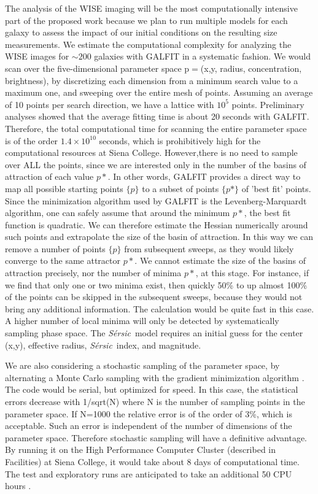 \documentclass[11pt, preprint]{aastex}
\newcommand{\sers}{{\it S\'{e}rsic}}
\begin{document}
{The analysis of the WISE imaging will be the most computationally
intensive part of the proposed work because we plan to run multiple
models for each galaxy to assess the impact of our initial conditions
on the resulting size measurements.  
We estimate the computational complexity for analyzing the WISE images
for $\sim 200$ 
galaxies with GALFIT in a systematic fashion. We would scan over the
five-dimensional parameter space  p$=$(x,y, radius, concentration,
brightness), by discretizing each dimension from a minimum search
value to a maximum one, and sweeping over the entire mesh of points.
Assuming an average of 10 points per search direction, we have a
lattice with $10^5$ points. Preliminary analyses showed that the average
fitting time is about 20 seconds with GALFIT. Therefore, the total
computational time  for scanning the entire parameter space is of the
order $1.4 \times 10^{10}$ seconds, which is  prohibitively high for the
computational resources at Siena College. However,there is no need to
sample over ALL the points, since we are interested only in the number
of the basins of attraction of each value $p*$. In other words, GALFIT
provides a direct way to map all possible starting points $\{p\}$ to a
subset of points $\{p*\}$ of 'best fit' points. Since the minimization
algorithm used by GALFIT is  the Levenberg-Marquardt algorithm, one can safely assume that around the minimum $p*$,
the best fit function is quadratic. We can therefore estimate the
Hessian numerically around such points and extrapolate the size of the
basin of attraction. In this way we can remove a number of points $\{p\}$
from subsequent sweeps, as they would likely converge to the same attractor
$p*$. We cannot estimate the size of the basins of
attraction precisely, nor the number of minima $p*$, at this stage. 
For instance, if we find that only one or two minima exist, then quickly
50\% to up almost 100\% of the points can be skipped in the subsequent
sweeps, because they would not bring any  additional information. The
calculation would be quite fast in this case.  A higher number of
local minima will only be detected by systematically sampling phase space.
The \sers \ model requires an initial guess for the center (x,y),
effective radius, \sers \ index, and magnitude.

We are also considering a stochastic sampling of the parameter space,
by alternating a Monte Carlo sampling with the gradient minimization
algorithm \citep{pardo11}. The code would be serial, but optimized for speed. In this
case, the statistical errors decrease with 1/sqrt(N) where N is the
number of sampling points in the parameter space. If N=1000 the
relative error is of the order of 3\%, which is acceptable. Such an error
is independent of the number of dimensions of the parameter space.
Therefore  stochastic sampling will have a definitive advantage.
By running it on the High Performance  Computer
Cluster  (described in Facilities) at Siena College, it would take about 8
days of computational time. The test and exploratory runs are
anticipated to take an additional 50 CPU hours \citep[for a recent
application of this method see,][]{sala12}.

}
\end{document}
